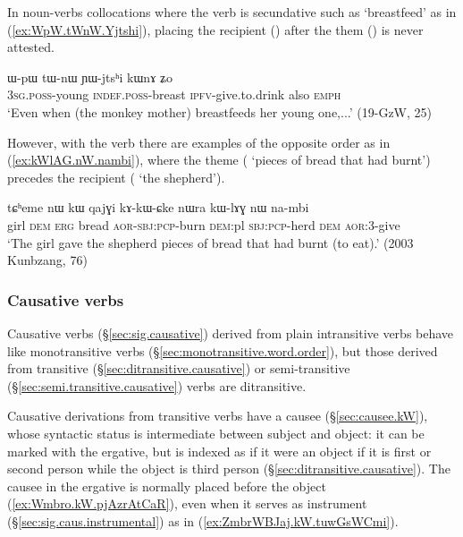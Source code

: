 In noun-verbs collocations where the verb is secundative such as  `breastfeed' as in (\ref{ex:WpW.tWnW.Yjtshi}), placing the recipient () after the them () is never attested.

\begin{exe}
\ex \label{ex:WpW.tWnW.Yjtshi}
\gll ɯ-pɯ tɯ-nɯ ɲɯ-jtsʰi kɯnɤ ʑo \\
\textsc{3sg}.\textsc{poss}-young \textsc{indef}.\textsc{poss}-breast \textsc{ipfv}-give.to.drink also \textsc{emph} \\
\glt `Even when (the monkey mother) breastfeeds her young one,...' (19-GzW, 25)
\end{exe}


However, with the verb  there are examples of the opposite order as in (\ref{ex:kWlAG.nW.nambi}), where the theme ( `pieces of bread that had burnt') precedes the recipient ( `the shepherd').


\begin{exe}
\ex \label{ex:kWlAG.nW.nambi}
\gll  tɕʰeme nɯ kɯ qajɣi kɤ-kɯ-ɕke nɯra kɯ-lɤɣ nɯ na-mbi \\
girl \textsc{dem} \textsc{erg} bread \textsc{aor}-\textsc{sbj}:\textsc{pcp}-burn \textsc{dem}:pl \textsc{sbj}:\textsc{pcp}-herd \textsc{dem} \textsc{aor}:3\flobv{}-give \\
\glt `The girl gave the shepherd pieces of bread that had burnt (to eat).' (2003 Kunbzang, 76)
\end{exe}

\subsubsection{Causative verbs} \label{sec:causative.word.order}
Causative verbs (§\ref{sec:sig.causative}) derived from plain intransitive verbs behave like monotransitive verbs (§\ref{sec:monotransitive.word.order}), but those derived from transitive (§\ref{sec:ditransitive.causative}) or semi-transitive (§\ref{sec:semi.transitive.causative}) verbs are ditransitive.

Causative derivations from transitive verbs have a causee (§\ref{sec:causee.kW}), whose syntactic status is intermediate between subject and object: it can be marked with the ergative, but is indexed as if it were an object if it is first or second person while the object is third person (§\ref{sec:ditransitive.causative}). The causee in the ergative is normally placed before the object (\ref{ex:Wmbro.kW.pjAzrAtCaR}), even when it serves as instrument (§\ref{sec:sig.caus.instrumental}) as in (\ref{ex:ZmbrWBJaj.kW.tuwGsWCmi}).


